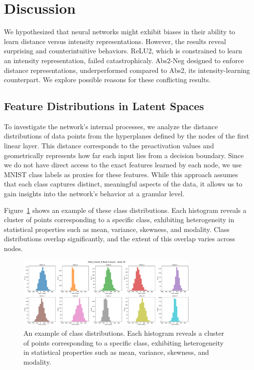 \section{Discussion}

We hypothesized that neural networks might exhibit biases in their ability to learn distance versus intensity representations. However, the results reveal surprising and counterintuitive behaviors. ReLU2, which is constrained to learn an intensity representation, failed catastrophicaly. Abs2-Neg designed to enforce distance representations, underperformed compared to Abs2, its intensity-learning counterpart. We explore possible reasons for these conflicting results.

\subsection{Feature Distributions in Latent Spaces}

To investigate the network's internal processes, we analyze the distance distributions of data points from the hyperplanes defined by the nodes of the first linear layer. This distance corresponds to the preactivation values and geometrically represents how far each input lies from a decision boundary. Since we do not have direct access to the exact features learned by each node, we use MNIST class labels as proxies for these features. While this approach assumes that each class captures distinct, meaningful aspects of the data, it allows us to gain insights into the network's behavior at a granular level.

Figure~\ref{fig:distance_distribution} shows an example of these class distributions. Each histogram reveals a cluster of points corresponding to a specific class, exhibiting heterogeneity in statistical properties such as mean, variance, skewness, and modality. Class distributions overlap significantly, and the extent of this overlap varies across nodes. 

\begin{figure}[htbp]
    \centering
    \includegraphics[width=0.8\textwidth]{images/distance_distribution}
    \caption{An example of class distributions. Each histogram reveals a cluster of points corresponding to a specific class, exhibiting heterogeneity in statistical properties such as mean, variance, skewness, and modality.}
    \label{fig:distance_distribution}
\end{figure}

